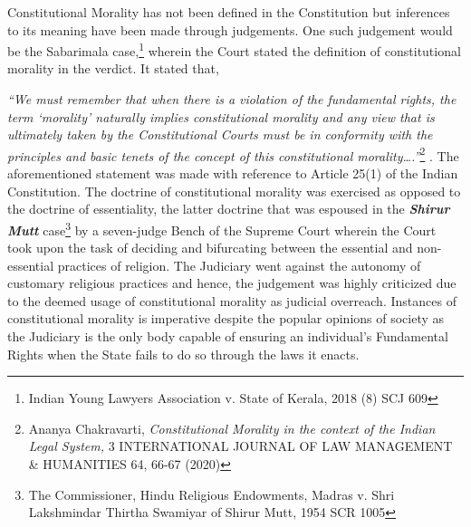 \setcounter{figure}{0}
\setcounter{table}{0}
\setcounter{footnote}{0}


\label{2020-art5}

\begin{multicols}{2}


\noi
Constitutional Morality has not been defined in the Constitution but inferences to its meaning
have been made through judgements. One such judgement would be the Sabarimala case,\footnote{Indian Young Lawyers Association v. State of Kerala, 2018 (8) SCJ 609}
wherein the Court stated the definition of constitutional morality in the verdict. It stated that,

\noi
\textit{“We must remember that when there is a violation of the fundamental rights, the term
‘morality’ naturally implies constitutional morality and any view that is ultimately taken by
the Constitutional Courts must be in conformity with the principles and basic tenets of the
concept of this constitutional morality….”}\footnote{Ananya Chakravarti, \textit{Constitutional Morality in the context of the Indian Legal System,} 3 INTERNATIONAL JOURNAL OF LAW MANAGEMENT \& HUMANITIES 64, 66-67 (2020)}
. The aforementioned statement was made with reference to Article 25(1) of the Indian Constitution. The doctrine of constitutional morality
was exercised as opposed to the doctrine of essentiality, the latter doctrine that was espoused
in the \textbf{\textit{Shirur Mutt}} case\footnote{The Commissioner, Hindu Religious Endowments, Madras v. Shri Lakshmindar Thirtha Swamiyar of Shirur Mutt, 1954 SCR 1005}  by a seven-judge Bench of the Supreme Court wherein the Court
took upon the task of deciding and bifurcating between the essential and non-essential
practices of religion. The Judiciary went against the autonomy of customary religious
practices and hence, the judgement was highly criticized due to the deemed usage of
constitutional morality as judicial overreach. Instances of constitutional morality is
imperative despite the popular opinions of society as the Judiciary is the only body capable of
ensuring an individual’s Fundamental Rights when the State fails to do so through the laws it
enacts.


\end{multicols}
